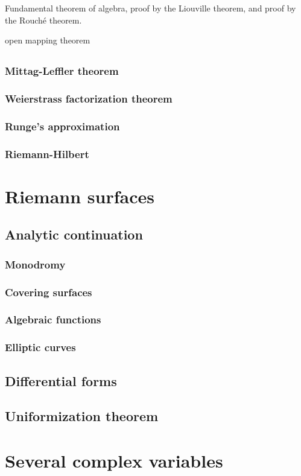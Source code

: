 \documentclass{../note}
\begin{document}
\begin{prb}
Fundamental theorem of algebra, proof by the Liouville theorem, and proof by the Rouch\'e theorem.
\end{prb}

open mapping theorem



\chapter{}

\section{Mittag-Leffler theorem}
\section{Weierstrass factorization theorem}
\section{Runge's approximation}




\section{Riemann-Hilbert}






\part{Riemann surfaces}

\chapter{Analytic continuation}
\section{Monodromy}
\section{Covering surfaces}
\section{Algebraic functions}
\section{Elliptic curves}

\chapter{Differential forms}

\chapter{Uniformization theorem}




\part{Several complex variables}
\end{document}

